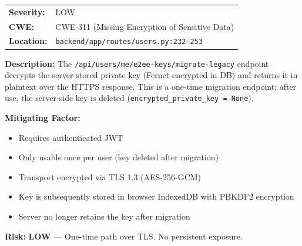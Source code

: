 \documentclass[11pt,a4paper]{article}
\begin{document}
\begin{tcolorbox}[colback=low!5, colframe=low, title=\textbf{S-03: Legacy Private Key Migration Returns Plaintext Key}]
\begin{tabularx}{\textwidth}{lX}
\textbf{Severity:} & \textcolor{low}{LOW} \\
\textbf{CWE:} & CWE-311 (Missing Encryption of Sensitive Data) \\
\textbf{Location:} & \texttt{backend/app/routes/users.py:232--253} \\
\end{tabularx}

\textbf{Description:} The \texttt{/api/users/me/e2ee-keys/migrate-legacy} endpoint decrypts the server-stored private key (Fernet-encrypted in DB) and returns it in plaintext over the HTTPS response. This is a one-time migration endpoint; after use, the server-side key is deleted (\texttt{encrypted\_private\_key = None}).

\textbf{Mitigating Factor:}
\begin{itemize}[nosep]
  \item Requires authenticated JWT
  \item Only usable once per user (key deleted after migration)
  \item Transport encrypted via TLS 1.3 (AES-256-GCM)
  \item Key is subsequently stored in browser IndexedDB with PBKDF2 encryption
  \item Server no longer retains the key after migration
\end{itemize}

\textbf{Risk:} \textcolor{low}{\textbf{LOW}} --- One-time path over TLS. No persistent exposure.
\end{tcolorbox}
\end{document}
